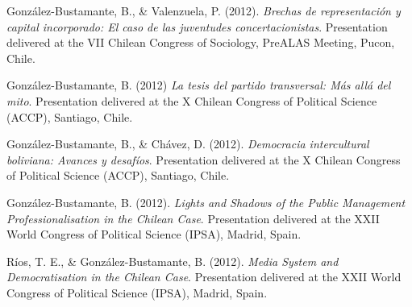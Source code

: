 \begin{publications}
\begin{benumerate}{87}

\item{González-Bustamante, B., \& Valenzuela, P. (2012). {\itshape Brechas de representación y capital incorporado: El caso de las juventudes concertacionistas}. Presentation delivered at the VII Chilean Congress of Sociology, PreALAS Meeting, Pucon, Chile.}\vspace{1mm}


\item{González-Bustamante, B. (2012) {\itshape La tesis del partido transversal: Más allá del mito}. Presentation delivered at the X Chilean Congress of Political Science (ACCP), Santiago, Chile.}\vspace{1mm}


\item{González-Bustamante, B., \& Chávez, D. (2012). {\itshape Democracia intercultural boliviana: Avances y desafíos}. Presentation delivered at the X Chilean Congress of Political Science (ACCP), Santiago, Chile.}\vspace{1mm}

\item{González-Bustamante, B. (2012). {\itshape Lights and Shadows of the Public Management Professionalisation in the Chilean Case}. Presentation delivered at the XXII World Congress of Political Science (IPSA), Madrid, Spain.}\vspace{1mm}

\item{Ríos, T. E., \& González-Bustamante, B. (2012). {\itshape Media System and Democratisation in the Chilean Case}. Presentation delivered at the XXII World Congress of Political Science (IPSA), Madrid, Spain.}\vspace{1mm}


\end{benumerate}
\end{publications}
